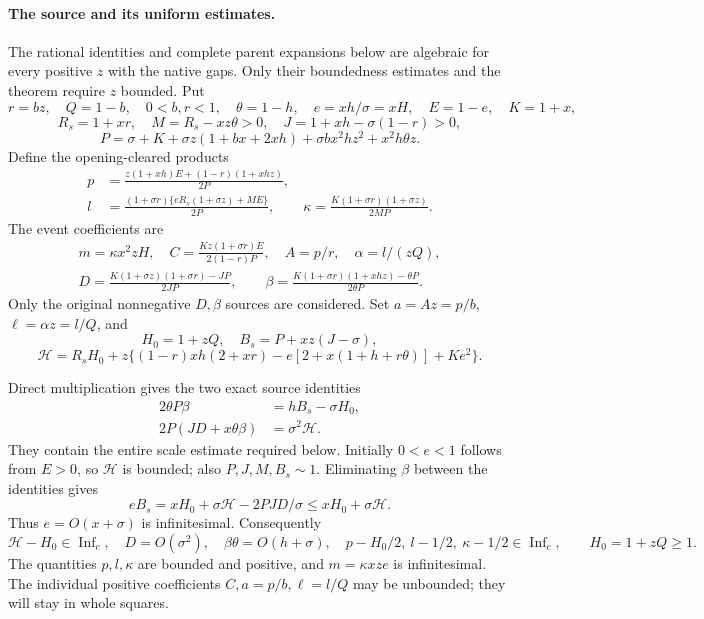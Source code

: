 \documentclass[10pt,a4paper]{article}
\begin{document}
\paragraph{The source and its uniform estimates.}
The rational identities and complete parent expansions below are
algebraic for every positive $z$ with the native gaps. Only their
boundedness estimates and the theorem require $z$ bounded.
Put
\[
 r=bz,\quad Q=1-b,\quad 0<b,r<1,\quad \theta=1-h,\quad
 e=xh/\sigma=xH,\quad E=1-e,\quad K=1+x,
\]
\[
 R_s=1+xr,\quad M=R_s-xz\theta>0,\quad
 J=1+xh-\sigma(1-r)>0,
\]
\[
 P=\sigma+K+\sigma z(1+bx+2xh)
              +\sigma bx^2hz^2+x^2h\theta z.
\]
Define the opening-cleared products
\[
\begin{split}
 p&=\frac{z(1+xh)E+(1-r)(1+xhz)}{2P},\\
 l&=\frac{(1+\sigma r)\{eR_s(1+\sigma z)+ME\}}{2P},\qquad
 \kappa=\frac{K(1+\sigma r)(1+\sigma z)}{2MP}.
\end{split}
\]
The event coefficients are
\[
\begin{gathered}
 m=\kappa x^2zH,\quad
 C=\frac{Kz(1+\sigma r)E}{2(1-r)P},\quad
 A=p/r,\quad \alpha=l/(zQ),\\
 D=\frac{K(1+\sigma z)(1+\sigma r)-JP}{2JP},\qquad
 \beta=\frac{K(1+\sigma r)(1+xhz)-\theta P}{2\theta P}.
\end{gathered}\tag{P1}\label{eq:c1-eta-large-source}
\]
Only the original nonnegative $D,\beta$ sources are considered.  Set
$a=Az=p/b$, $\ell=\alpha z=l/Q$, and
\[
 H_0=1+zQ,\quad B_s=P+xz(J-\sigma),
\]
\[
 \mathcal H=R_sH_0+z\{(1-r)xh(2+xr)
       -e[2+x(1+h+r\theta)]+Ke^2\}.
\]

Direct multiplication gives the two exact source identities
\begin{align}
 2\theta P\beta&=hB_s-\sigma H_0,\tag{BE3}\label{eq:c1-unification-source}\\
 2P(JD+x\theta\beta)&=\sigma^2\mathcal H.\tag{BE4}\label{eq:c1-unification-source-sphere}
\end{align}
They contain the entire scale estimate required below. Initially
$0<e<1$ follows from $E>0$, so $\mathcal H$ is bounded; also
$P,J,M,B_s\sim1$. Eliminating $\beta$ between the identities gives
\begin{equation}\label{eq:c1-unification-e-bound}
 eB_s=xH_0+\sigma\mathcal H-2PJD/\sigma
       \le xH_0+\sigma\mathcal H.
\end{equation}
Thus $e=O(x+\sigma)$ is infinitesimal. Consequently
\[
 \mathcal H-H_0\in\operatorname{Inf}_c,\quad
 D=O(\sigma^2),\quad \beta\theta=O(h+\sigma),\quad
 p-H_0/2,\ l-1/2,\ \kappa-1/2\in\operatorname{Inf}_c,
 \qquad H_0=1+zQ\ge1.
\]
The quantities $p,l,\kappa$ are bounded and positive, and
$m=\kappa xze$ is infinitesimal. The individual positive coefficients
$C,a=p/b,\ell=l/Q$ may be unbounded; they will stay in whole squares.
\end{document}
